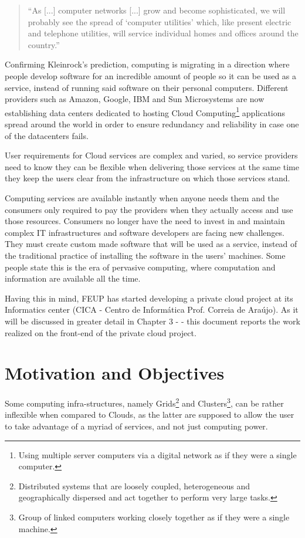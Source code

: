 \begin{quote}
  ``As [...] computer networks [...] grow and become sophisticated, we will probably see the spread of `computer utilities' which, like present electric and telephone utilities, will service individual homes and offices around the country.''~\cite{Buyya2009599} 
\end{quote}
	
Confirming Kleinrock's prediction, computing is migrating in a direction where people develop software for an incredible amount of people so it can be used as a service, instead of running said software on their personal computers. Different providers such as Amazon, Google, IBM and Sun Microsystems are now establishing data centers dedicated to hosting Cloud Computing\footnote{Using multiple server computers via a digital network as if they were a single computer.} applications spread around the world in order to ensure redundancy and reliability in case one of the datacenters fails. 

User requirements for Cloud services are complex and varied, so service providers need to know they can be flexible when delivering those services at the same time they keep the users clear from the infrastructure on which those services stand.

Computing services are available instantly when anyone needs them and the consumers only required to pay the providers when they actually access and use those resources. Consumers no longer have the need to invest in and maintain complex IT infrastructures and software developers are facing new challenges. They must create custom made software that will be used as a service, instead of the traditional practice of installing the software in the users' machines. Some people state this is the era of pervasive computing, where computation and information are available all the time.~\citet{ieees}

Having this in mind, FEUP has started developing a private cloud project at its Informatics center (CICA - Centro de Informática Prof. Correia de Araújo). As it will be discussed in greater detail in Chapter 3 -  - this document reports the work realized on the front-end of the private cloud project.

\section{Motivation and Objectives} \label{sec:motivation}

Some computing infra-structures, namely Grids\footnote{Distributed systems that are loosely coupled, heterogeneous and geographically dispersed and act together to perform very large tasks.} and Clusters\footnote{Group of linked computers working closely together as if they were a single machine.}, can be rather inflexible when compared to Clouds, as the latter are supposed to allow the user to take advantage of a myriad of services, and not just computing power.~\cite{brighthub}
	
